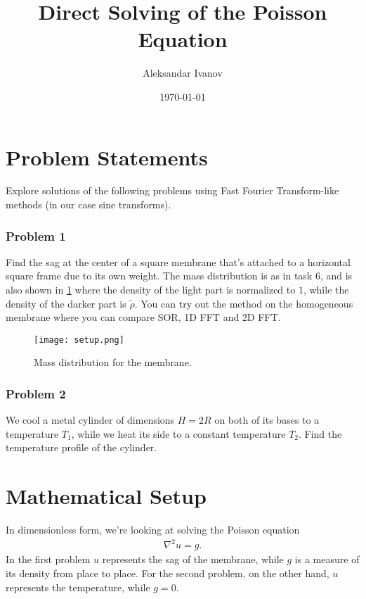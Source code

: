 \documentclass[10pt,a4paper,twocolumn]{article}
\begin{document}
\title{Direct Solving of the Poisson Equation}
\author{Aleksandar Ivanov}
\date{\today}
\maketitle

\section{Problem Statements}

Explore solutions of the following problems using Fast Fourier Transform-like methods (in our case sine transforms).

\subsubsection*{Problem 1}

Find the sag at the center of a square membrane that's attached to a horizontal square frame due to its own weight. The mass distribution is as in task 6, and is also shown in \cref{fig:setup} where the density of the light part is normalized to $1$, while the density of the darker part is $\tilde{\rho}$. You can try out the method on the homogeneous membrane where you can compare SOR, 1D FFT and 2D FFT.

\begin{figure}[!b]
    \centering
    \texttt{[image: setup.png]}
    \caption{Mass distribution for the membrane.}
    \label{fig:setup}
\end{figure}

\subsubsection*{Problem 2}

We cool a metal cylinder of dimensions $H = 2R$ on both of its bases to a temperature $T_1$, while we heat its side to a constant temperature $T_2$. Find the temperature profile of the cylinder.

\section{Mathematical Setup}

In dimensionless form, we're looking at solving the Poisson equation
%
\begin{align}
    \nabla^2 u = g.
\end{align}
%
In the first problem $u$ represents the sag of the membrane, while $g$ is a measure of its density from place to place. For the second problem, on the other hand, $u$ represents the temperature, while $g=0$.
\end{document}
